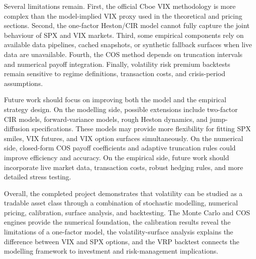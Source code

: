 Several limitations remain. First, the official Cboe VIX methodology is more complex than the model-implied VIX proxy used in the theoretical and pricing sections. Second, the one-factor Heston/CIR model cannot fully capture the joint behaviour of SPX and VIX markets. Third, some empirical components rely on available data pipelines, cached snapshots, or synthetic fallback surfaces when live data are unavailable. Fourth, the COS method depends on truncation intervals and numerical payoff integration. Finally, volatility risk premium backtests remain sensitive to regime definitions, transaction costs, and crisis-period assumptions.

Future work should focus on improving both the model and the empirical strategy design. On the modelling side, possible extensions include two-factor CIR models, forward-variance models, rough Heston dynamics, and jump-diffusion specifications. These models may provide more flexibility for fitting SPX smiles, VIX futures, and VIX option surfaces simultaneously. On the numerical side, closed-form COS payoff coefficients and adaptive truncation rules could improve efficiency and accuracy. On the empirical side, future work should incorporate live market data, transaction costs, robust hedging rules, and more detailed stress testing.

Overall, the completed project demonstrates that volatility can be studied as a tradable asset class through a combination of stochastic modelling, numerical pricing, calibration, surface analysis, and backtesting. The Monte Carlo and COS engines provide the numerical foundation, the calibration results reveal the limitations of a one-factor model, the volatility-surface analysis explains the difference between VIX and SPX options, and the VRP backtest connects the modelling framework to investment and risk-management implications.